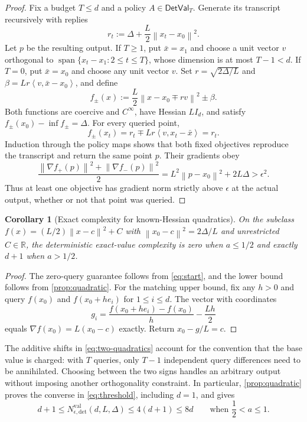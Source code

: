 \documentclass[11pt]{article}
\numberwithin{equation}{section}
\newtheorem{corollary}[corollary]{Corollary}
\theoremstyle{definition}
\theoremstyle{remark}
\newcommand{\R}{\mathbb{R}}
\newcommand{\norm}[1]{\left\lVert #1\right\rVert}
\newcommand{\ip}[2]{\left\langle #1,#2\right\rangle}
\newcommand{\DetVal}{\mathsf{DetVal}}
\newcommand{\Nval}{N_{\epsilon,\mathrm{det}}^{\mathrm{val}}}
\newcommand{\Span}{\operatorname{span}}
\begin{document}
\begin{proof}
Fix a budget $T\leq d$ and a policy $A\in\DetVal_T$.
Generate its transcript recursively with replies
\begin{equation}
 r_t:=\Delta+\frac L2\norm{x_t-x_0}^2.
 \label{eq:quadratic-replies}
\end{equation}
Let $p$ be the resulting output. If $T\geq1$, put $\bar x=x_1$ and choose a
unit vector $v$ orthogonal to
$\Span\{x_t-x_1:2\leq t\leq T\}$, whose dimension is at most
$T-1<d$. If $T=0$, put $\bar x=x_0$ and choose any unit vector $v$.
Set $r=\sqrt{2\Delta/L}$ and $\beta=Lr\ip{v}{\bar x-x_0}$, and define
\begin{equation}
 f_\pm(x):=\frac L2\norm{x-x_0\mp rv}^2\pm\beta.
 \label{eq:two-quadratics}
\end{equation}
Both functions are coercive and $C^\infty$, have Hessian $LI_d$, and satisfy
$f_\pm(x_0)-\inf f_\pm=\Delta$. For every queried point,
\[
 f_\pm(x_t)=r_t\mp Lr\ip{v}{x_t-\bar x}=r_t.
\]
Induction through the policy maps shows that both fixed objectives reproduce
the transcript and return the same point $p$. Their gradients obey
\[
 \frac{\norm{\nabla f_+(p)}^2+\norm{\nabla f_-(p)}^2}{2}
 =L^2\norm{p-x_0}^2+2L\Delta>\epsilon^2.
\]
Thus at least one objective has gradient norm strictly above $\epsilon$ at
the actual output, whether or not that point was queried.
\end{proof}

\begin{corollary}[Exact complexity for known-Hessian quadratics]
\label{cor:quadratic-exact}
On the subclass $f(x)=(L/2)\norm{x-c}^2+C$ with
$\norm{x_0-c}^2=2\Delta/L$ and unrestricted $C\in\R$, the deterministic
exact-value complexity is zero when $a\leq1/2$ and exactly $d+1$ when
$a>1/2$.
\end{corollary}

\begin{proof}
The zero-query guarantee follows from \eqref{eq:start}, and the lower bound
follows from \cref{prop:quadratic}. For the matching upper bound, fix any
$h>0$ and query $f(x_0)$ and $f(x_0+he_i)$ for $1\leq i\leq d$.
The vector with coordinates
\[
 g_i=\frac{f(x_0+he_i)-f(x_0)}h-\frac{Lh}{2}
\]
equals $\nabla f(x_0)=L(x_0-c)$ exactly. Return $x_0-g/L=c$.
\end{proof}

The additive shifts in \eqref{eq:two-quadratics} account for the convention
that the base value is charged: with $T$ queries, only $T-1$ independent
query differences need to be annihilated. Choosing between the two signs
handles an arbitrary output without imposing another orthogonality
constraint. In particular, \cref{prop:quadratic} proves the converse in
\eqref{eq:threshold}, including $d=1$, and gives
\begin{equation}
 d+1\leq\Nval(d,L,\Delta)\leq4(d+1)\leq8d
 \qquad\text{when }\frac12<a\leq1.
 \label{eq:transition}
\end{equation}
\end{document}
